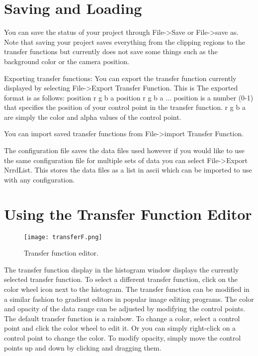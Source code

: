 \section{Saving and Loading}

You can save the status of your project through File->Save or File->save as. Note that saving your project saves everything from the clipping regions to the transfer functions but currently does not save some things such as the background color or the camera position.

Exporting transfer functions: You can export the transfer function currently displayed by selecting File->Export Transfer Function. This is The exported format is as follows: position r g b a position r g b a ... position is a number (0-1) that specifies the position of your control point in the transfer function. r g b a are simply the color and alpha values of the control point.

You can import saved transfer functions from File->import Transfer Function. 

The configuration file saves the data files used however if you would like to use the same configuration file for multiple sets of data you can select File->Export NrrdList.  This stores the data files as a list in ascii which can be imported to use with any configuration.  

\section{Using the Transfer Function Editor}

\begin{figure}[htbp]
  \center
  \texttt{[image: transferF.png]}
  \caption{Transfer function editor.}
  \label{fig:manta_tf}
\end{figure}

The transfer function display in the histogram window displays the currently selected transfer function. To select a different transfer function, click on the color wheel icon next to the histogram. The transfer function can be modified in a similar fashion to gradient editors in popular image editing programs. The color and opacity of the data range can be adjusted by modifying the control points. The default transfer function is a rainbow. To change a color, select a control point and click the color wheel to edit it. Or you can simply right-click on a control point to change the color. To modify opacity, simply move the control points up and down by clicking and dragging them.

